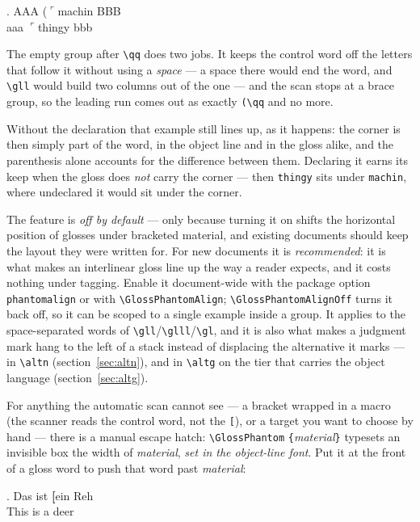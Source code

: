 \documentclass[11pt,a4paper]{article}
\newcommand{\cs}[1]{\texttt{\textbackslash #1}}
\newcommand{\opt}[1]{\texttt{#1}}
\newcommand{\meta}[1]{\textrm{\itshape\textlangle#1\textrangle}}
\newcommand{\marg}[1]{\penalty300 \texttt{\{}\meta{#1}\texttt{\}}}
\begin{document}
\begin{code}
\newcommand{\qq}{\ensuremath{\ulcorner}}
\GlossPhantomChars{*?([<\#\%\qq}

\ex. \gll AAA (\qq{}machin BBB\\
     aaa \qq{}thingy bbb\\
\end{code}

\noindent The empty group after \cs{qq} does two jobs. It keeps the control
word off the letters that follow it without using a \emph{space} --- a space
there would end the word, and \cs{gll} would build two columns out of the
one --- and the scan stops at a brace group, so the leading run comes out as
exactly \verb|(\qq| and no more.

Without the declaration that example still lines up, as it happens: the
corner is then simply part of the word, in the object line and in the gloss
alike, and the parenthesis alone accounts for the difference between them.
Declaring it earns its keep when the gloss does \emph{not} carry the corner
--- then \texttt{thingy} sits under \texttt{machin}, where undeclared it
would sit under the corner.

The feature is \emph{off by default} --- only because turning it on shifts
the horizontal position of glosses under bracketed material, and existing
documents should keep the layout they were written for. For new documents it
is \emph{recommended}: it is what makes an interlinear gloss line up the way a
reader expects, and it costs nothing under tagging. Enable it document-wide
with the package option \opt{phantomalign} or with \cs{GlossPhantomAlign};
\cs{GlossPhantomAlignOff} turns it back off, so it can be scoped to a single
example inside a group. It applies to the space-separated words of
\cs{gll}/\cs{glll}/\cs{gl}, and it is also what makes a judgment mark hang
to the left of a stack instead of displacing the alternative it marks ---
in \cs{altn} (section~\ref{sec:altn}), and in \cs{altg} on the tier that
carries the object language (section~\ref{sec:altg}).

For anything the automatic scan cannot see --- a bracket wrapped in a macro
(the scanner reads the control word, not the \texttt{[}), or a target you
want to choose by hand --- there is a manual escape hatch:
\cs{GlossPhantom}\marg{material} typesets an invisible box the width of
\meta{material}, \emph{set in the object-line font}. Put it at the front of a
gloss word to push that word past \meta{material}:

\begin{code}
\ex. \gll Das ist \textbf{[}ein Reh\\
This is \GlossPhantom{\textbf{[}}a deer\\
\end{code}
\end{document}
